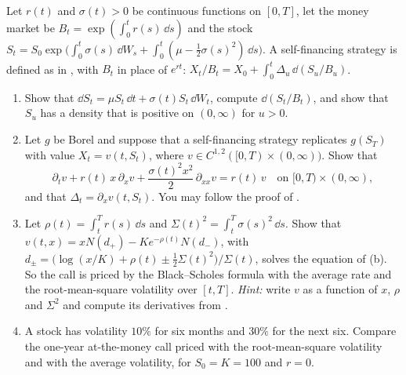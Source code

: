 \begin{exercise}\label{ex:dh-time}
\medium Let $r(t)$ and $\sigma(t)>0$ be continuous functions on $[0,T]$, let the money market be
$B_t=\exp(\int_0^tr(s)\,\dd s)$ and the stock
$S_t=S_0\exp\big(\int_0^t\sigma(s)\,\dd W_s+\int_0^t(\mu-\frac12\sigma(s)^2)\,\dd s\big)$. A
self-financing strategy is defined as in , with $B_t$ in place of
$e^{rt}$: $X_t/B_t=X_0+\int_0^t\Delta_u\,\dd(S_u/B_u)$.
\begin{enumerate}[label=(\alph*)]
  \item Show that $\dd S_t=\mu S_t\,\dd t+\sigma(t)S_t\,\dd W_t$, compute $\dd(S_t/B_t)$, and show
    that $S_u$ has a density that is positive on $(0,\infty)$ for $u>0$.
  \item Let $g$ be Borel and suppose that a self-financing strategy replicates $g(S_T)$ with
    value $X_t=v(t,S_t)$, where $v\in C^{1,2}([0,T)\times(0,\infty))$. Show that
    \[
      \partial_tv+r(t)\,x\,\partial_xv+\frac{\sigma(t)^2x^2}{2}\,\partial_{xx}v=r(t)\,v
      \quad\text{on }[0,T)\times(0,\infty),
    \]
    and that $\Delta_t=\partial_xv(t,S_t)$. You may follow the proof of .
  \item Let $\rho(t)=\int_t^Tr(s)\,\dd s$ and $\Sigma(t)^2=\int_t^T\sigma(s)^2\,\dd s$. Show that
    $v(t,x)=xN(d_+)-Ke^{-\rho(t)}N(d_-)$, with
    $d_\pm=\big(\log(x/K)+\rho(t)\pm\frac12\Sigma(t)^2\big)/\Sigma(t)$, solves the equation of (b).
    So the call is priced by the Black--Scholes formula with the average rate and the
    root-mean-square volatility over $[t,T]$. \emph{Hint:} write $v$ as a function of $x$,
    $\rho$ and $\Sigma^2$ and compute its derivatives from .
  \item A stock has volatility $10\%$ for six months and $30\%$ for the next six. Compare the
    one-year at-the-money call priced with the root-mean-square volatility and with the
    average volatility, for $S_0=K=100$ and $r=0$.
\end{enumerate}
\end{exercise}

